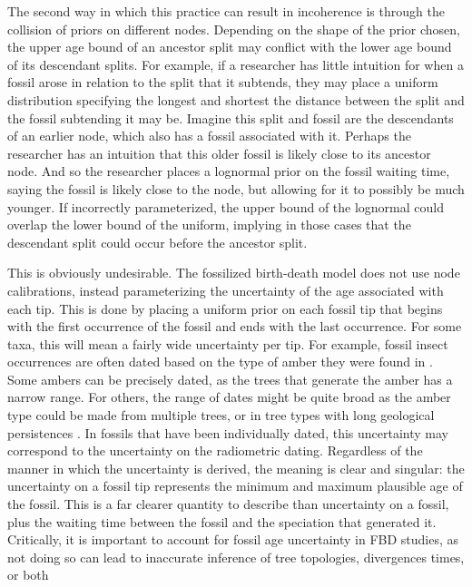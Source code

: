 \documentclass{article}
\begin{document}
The second way in which this practice can result in incoherence is through the collision of priors on different nodes.
Depending on the shape of the prior chosen,  the upper age bound of an ancestor split may conflict with the lower age bound of its descendant splits. 
For example, if a researcher has little intuition for when a fossil arose in relation to the split that it subtends, they may place a uniform distribution specifying the longest and shortest the distance between the split and the fossil subtending it may be.
Imagine this split and fossil are the descendants of an earlier node, which also has a fossil associated with it. 
Perhaps the researcher has an intuition that this older fossil is likely close to its ancestor node. 
And so the researcher places a lognormal prior on the fossil waiting time, saying the fossil is likely close to the node, but allowing for it to possibly be much younger. 
If incorrectly parameterized, the upper bound of the lognormal could overlap the lower bound of the uniform, implying in those cases that the descendant split could occur before the ancestor split.

This is obviously undesirable.
The fossilized birth-death model does not use node calibrations, instead parameterizing the uncertainty of the age associated with each tip.
This is done by placing a uniform prior on each fossil tip that begins with the first occurrence of the fossil and ends with the last occurrence. 
For some taxa, this will mean a fairly wide uncertainty per tip.
For example, fossil insect occurrences are often dated based on the type of amber they were found in \citep{lapolla2013}.
Some ambers can be precisely dated, as the trees that generate the amber has a narrow range.
For others, the range of dates might be quite broad as the amber type could be made from multiple trees, or in tree types with long geological persistences \citep{poinar2000}. 
In fossils that have been individually dated, this uncertainty may correspond to the uncertainty on the radiometric dating.
Regardless of the manner in which the uncertainty is derived, the meaning is clear and singular: the uncertainty on a fossil tip represents the minimum and maximum plausible age of the fossil.
This is a far clearer quantity to describe than uncertainty on a fossil, plus the waiting time between the fossil and the speciation that generated it. Critically, it is important to account for fossil age uncertainty in FBD studies, as not doing so can lead to inaccurate inference of tree topologies, divergences times, or both \citep{BaridoSottani2019a,BaridoSottaniEtAl2020}
\end{document}

